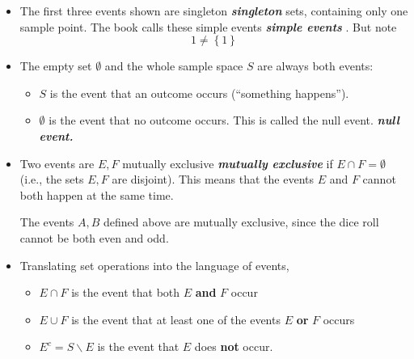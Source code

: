 \documentclass[10pt]{article}
\theoremstyle{definition}
\newcommand{\1}[1]{\textbf{1}_{\left[#1\right]}} %
\DeclareRobustCommand{\demph}[1]{%
  \ifmmode
  {\color{Blue}#1}%
  \else
  {\color{Blue}\bfseries\slshape #1}%
  \fi
}
\begin{document}
\begin{itemize}
  \item The first three events shown are \demph{singleton} sets, containing
  only one sample point. The book calls these \demph{simple events}. But note
  \begin{equation*}
    1\neq \left\{1\right\} 
  \end{equation*}

  \item The empty set $\emptyset$ and the whole sample space $S$ are always
  both events:
  \begin{itemize}[$\cdot$]
    \item $S$ is the event that an outcome occurs (``something happens'').
    \item $\emptyset$ is the event that no outcome occurs. This is called the
    \demph{null event.}
  \end{itemize}
  

  
  \item Two events are $E,F$ \demph{mutually exclusive} if $E\cap F=\emptyset$
  (i.e., the sets $E,F$ are disjoint). This means that the events $E$ and $F$
  cannot both happen at the same time.

  The events $A,B$ defined above are mutually exclusive, since the dice
  roll cannot be both even and odd.
  
  \item Translating set operations into the language of events,
  \begin{itemize}[$\cdot$]
    \item $E\cap F$ is the
    event that both $E$ \textbf{and} $F$ occur
    \item $E\cup F$ is the
    event that at least one of the events $E$ \textbf{or} $F$ occurs
    \item $E^{c}=S\backslash E$ is the event that $E$ does \textbf{not} occur.
  \end{itemize}

\end{itemize}
\end{document}
